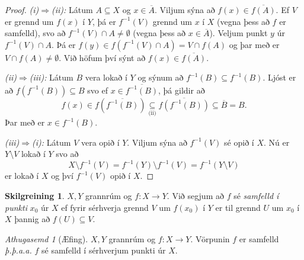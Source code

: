 \documentclass[a4paper,icelandic]{book}
\theoremstyle{definition}
\newtheorem{skilgr}{Skilgreining}[section]
\theoremstyle{plain}
\theoremstyle{remark}
\newtheorem*{ath}{Athugasemd}
\begin{document}
\begin{proof}
  \emph{(i)$\Rightarrow$(ii):} Látum $A\subseteq X$ og $x\in\overline A$. Viljum
  sýna að $f(x)\in\overline{f(A)}$. Ef $V$ er grennd um $f(x)$ í $Y$, þá er
  $f^{-1}(V)$ grennd um $x$ í $X$ (vegna þess að $f$ er samfelld), svo að
  $f^{-1}(V)\cap A\neq \emptyset$ (vegna þess að $x\in\overline A$). Veljum
  punkt $y$ úr $f^{-1}(V)\cap A$. Þá er $f(y)\in f(f^{-1}(V)\cap A) = V\cap
  f(A)$ og þar með er $V\cap f(A)\neq \emptyset$. Við höfum því sýnt að
  $f(x)\in\overline{f(A)}$.

  \emph{(ii)$\Rightarrow$(iii):} Látum $B$ vera lokað í $Y$ og sýnum að
  $f^{-1}(B)\subseteq f^{-1}(B)$. Ljóst er að $f(f^{-1}(B))\subseteq B$ svo ef
  $x\in \overline{f^{-1}(B)}$, þá gildir að 
  \[
  f(x)
  \in
  f(\overline{f^{-1}(B)}) 
  \underset{\text{(ii)}}{\subseteq}
  \overline{f(f^{-1}(B))}
  \subseteq
  \overline B
  = B.
  \]
  Þar með er $x\in f^{-1}(B)$.

  \emph{(iii)$\Rightarrow$(i):} Látum $V$ vera opið í $Y$. Viljum sýna að
  $f^{-1}(V)$ sé opið í $X$. Nú er $Y\setminus V$ lokað í $Y$ svo að 
  \[
  X\setminus f^{-1}(V)
  = f^{-1}(Y)\setminus f^{-1}(V)
  = f^{-1}(Y\setminus V)
  \]
  er lokað í $X$ og því $f^{-1}(V)$ opið í $X$.
\end{proof}
\begin{skilgr}
  $X,Y$ grannrúm og $f:X\to Y$. Við segjum að $f$ sé \emph{samfelld í
  punkti} $x_0$ úr $X$ ef fyrir sérhverja grennd
  $V$ um $f(x_0)$ í $Y$ er til grennd $U$ um $x_0$ í $X$ þannig að
  $f(U)\subseteq V$.
\end{skilgr}
\begin{ath}[Æfing]
  $X,Y$ grannrúm og $f:X\to Y$. Vörpunin $f$ er samfelld \emph{þ.þ.a.a.}
  $f$ sé samfelld í sérhverjum punkti úr $X$.
\end{ath}
\end{document}
